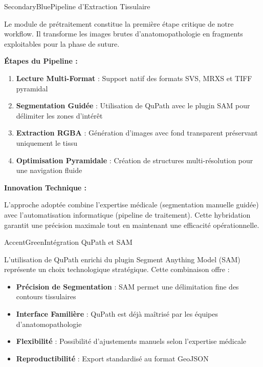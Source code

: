 \documentclass[11pt,a4paper]{article}
\begin{document}
\begin{subsectionbox}{SecondaryBlue}{Pipeline d'Extraction Tissulaire}

Le module de prétraitement constitue la première étape critique de notre workflow. Il transforme les images brutes d'anatomopathologie en fragments exploitables pour la phase de suture.

\textbf{Étapes du Pipeline :}

\begin{enumerate}[leftmargin=*]
    \item \textbf{Lecture Multi-Format} : Support natif des formats SVS, MRXS et TIFF pyramidal
    \item \textbf{Segmentation Guidée} : Utilisation de QuPath avec le plugin SAM pour délimiter les zones d'intérêt
    \item \textbf{Extraction RGBA} : Génération d'images avec fond transparent préservant uniquement le tissu
    \item \textbf{Optimisation Pyramidale} : Création de structures multi-résolution pour une navigation fluide
\end{enumerate}

\textbf{Innovation Technique :}

L'approche adoptée combine l'expertise médicale (segmentation manuelle guidée) avec l'automatisation informatique (pipeline de traitement). Cette hybridation garantit une précision maximale tout en maintenant une efficacité opérationnelle.

\end{subsectionbox}

\begin{subsectionbox}{AccentGreen}{Intégration QuPath et SAM}

L'utilisation de QuPath enrichi du plugin Segment Anything Model (SAM) représente un choix technologique stratégique. Cette combinaison offre :

\begin{itemize}[leftmargin=*]
    \item \textbf{Précision de Segmentation} : SAM permet une délimitation fine des contours tissulaires
    \item \textbf{Interface Familière} : QuPath est déjà maîtrisé par les équipes d'anatomopathologie
    \item \textbf{Flexibilité} : Possibilité d'ajustements manuels selon l'expertise médicale
    \item \textbf{Reproductibilité} : Export standardisé au format GeoJSON
\end{itemize}

\end{subsectionbox}
\end{document}
